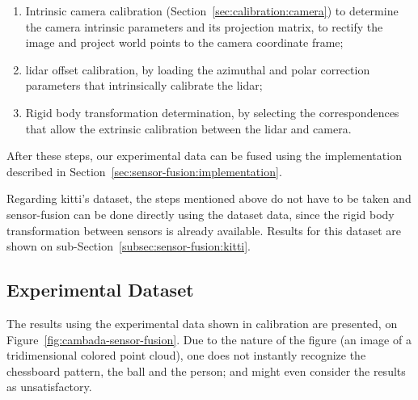 \begin{enumerate}
	\item Intrinsic camera calibration (Section~\ref{sec:calibration:camera}) to determine the camera intrinsic parameters and its projection matrix, to rectify the image and project world points to the camera coordinate frame;
	\item \ac{lidar} offset calibration, by loading the azimuthal and polar correction parameters that intrinsically calibrate the \ac{lidar};
	\item Rigid body transformation determination, by selecting the correspondences that allow the extrinsic calibration between the \ac{lidar} and camera.
\end{enumerate}

After these steps, our experimental data can be fused using the implementation described in Section~\ref{sec:sensor-fusion:implementation}.

Regarding \ac{kitti}'s dataset, the steps mentioned above do not have to be taken and sensor-fusion can be done directly using the dataset data, since the rigid body transformation between sensors is already available. Results for this dataset are shown on sub-Section~\ref{subsec:sensor-fusion:kitti}.

\subsection{Experimental Dataset}
\label{subsec:sensor-fusion:experimental-dataset}
The results using the experimental data shown in calibration are presented, on Figure~\ref{fig:cambada-sensor-fusion}. Due to the nature of the figure (an image of a tridimensional colored point cloud), one does not instantly recognize the chessboard pattern, the ball and the person; and might even consider the results as unsatisfactory. 

